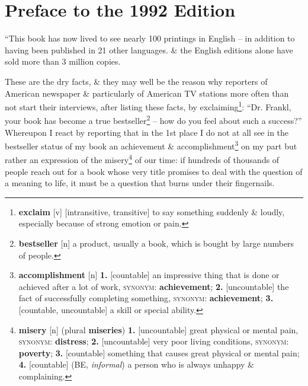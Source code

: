 \documentclass[oneside]{book}
\numberwithin{equation}{section}
\begin{document}

\section*{Preface to the 1992 Edition}
``This book has now lived to see nearly 100 printings in English -- in addition to having been published in 21 other languages. \& the English editions alone have sold more than 3 million copies.

These are the dry facts, \& they may well be the reason why reporters of American newspaper \& particularly of American TV stations more often than not start their interviews, after listing these facts, by exclaiming\footnote{\textbf{exclaim} [v] [intransitive, transitive] to say something suddenly \& loudly, especially because of strong emotion or pain.}: ``Dr. Frankl, your book has become a true bestseller\footnote{\textbf{bestseller} [n] a product, usually a book, which is bought by large numbers of people.} -- how do you feel about such a success?'' Whereupon I react by reporting that in the 1st place I do not at all see in the bestseller status of my book an achievement \& accomplishment\footnote{\textbf{accomplishment} [n] \textbf{1.} [countable] an impressive thing that is done or achieved after a lot of work, \textsc{synonym}: \textbf{achievement}; \textbf{2.} [uncountable] the fact of successfully completing something, \textsc{synonym}: \textbf{achievement}; \textbf{3.} [countable, uncountable] a skill or special ability.} on my part but rather an expression of the misery\footnote{\textbf{misery} [n] (plural \textbf{miseries}) \textbf{1.} [uncountable] great physical or mental pain, \textsc{synonym}: \textbf{distress}; \textbf{2.} [uncountable] very poor living conditions, \textsc{synonym}: \textbf{poverty}; \textbf{3.} [countable] something that causes great physical or mental pain; \textbf{4.} [countable] (BE, \textit{informal}) a person who is always unhappy \& complaining.} of our time: if hundreds of thousands of people reach out for a book whose very title promises to deal with the question of a meaning to life, it must be a question that burns under their fingernails.
\end{document}
